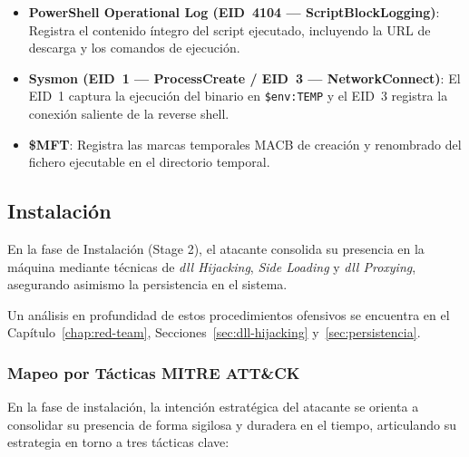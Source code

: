 \begin{itemize}
    \item \textbf{PowerShell Operational Log (EID~4104 — ScriptBlockLogging)}: Registra el contenido íntegro del script ejecutado, incluyendo la URL de descarga y los comandos de ejecución.
    \item \textbf{Sysmon (EID~1 — ProcessCreate / EID~3 — NetworkConnect)}: El EID~1 captura la ejecución del binario en \texttt{\$env:TEMP} y el EID~3 registra la conexión saliente de la reverse shell.
    \item \textbf{\$MFT}: Registra las marcas temporales MACB de creación y renombrado del fichero ejecutable en el directorio temporal.
\end{itemize}


\newpage
\subsection{Instalación} \label{sec:instalacion}

En la fase de Instalación (Stage 2), el atacante consolida su presencia en la máquina mediante técnicas de \textit{\acrshort{dll} Hijacking}, \textit{Side Loading} y \textit{\acrshort{dll} Proxying}, asegurando asimismo la persistencia en el sistema.

Un análisis en profundidad de estos procedimientos ofensivos se encuentra en el Capítulo~\ref{chap:red-team}, Secciones~\ref{sec:dll-hijacking} y~\ref{sec:persistencia}.

\subsubsection{Mapeo por Tácticas MITRE ATT\&CK}

En la fase de instalación, la intención estratégica del atacante se orienta a consolidar su presencia de forma sigilosa y duradera en el tiempo, articulando su estrategia en torno a tres tácticas clave:

